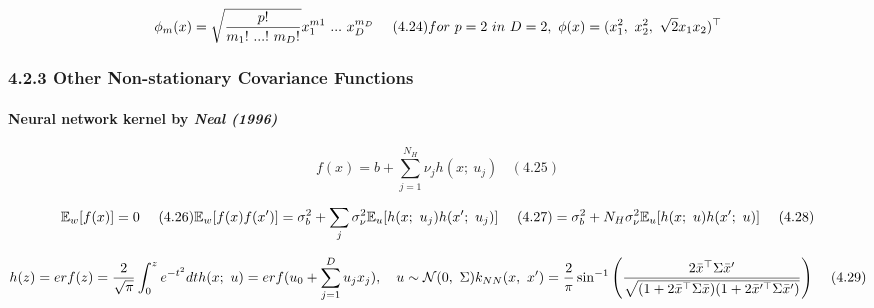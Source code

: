 \documentclass[
]{article}
\begin{document}
\[
\phi_m(x) = \sqrt {\frac {p!} {m_1!\ ... !\ m_D!}} x_1^{m1}\ ...\ x_D^{m_D}
\ \ \ \ (4.24)\\
for\ p = 2\ in\ D = 2,\ \phi(x) = (x^2_1,\ x^2_2,\ \sqrt 2x_1x_2)^{\top}
\]

\hypertarget{other-non-stationary-covariance-functions}{%
\subsubsection{4.2.3 Other Non-stationary Covariance
Functions}\label{other-non-stationary-covariance-functions}}

\hypertarget{neural-network-kernel-by-neal-1996}{%
\paragraph{\texorpdfstring{Neural network kernel by \emph{Neal
(1996)}}{Neural network kernel by Neal (1996)}}\label{neural-network-kernel-by-neal-1996}}

\[
f(x) = b + \sum^{N_H}_{j=1}
\nu_j h(x;\ u_j)
\ \ \ \ (4.25)
\]

\[
\mathbb E_w[f(x)] = 0 \ \ \ \ (4.26)\\
\mathbb E_w[f(x)f(x')] = \sigma_b^2 + 
\sum_j \sigma^2_\nu \mathbb E_u[h(x;\ u_j)h(x';\ u_j)] 
\ \ \ \ (4.27)\\
= \sigma_b^2 + N_H \sigma_\nu^2 \mathbb E_u[h(x;\ u)h(x';\ u)] \ \ \ \ (4.28)
\]

\[
h(z) = erf(z) = \frac 2 {\sqrt \pi} \int_0^z e^{-t^2} dt\\
h(x;\ u) = erf(u_0 + \sum^D_{j=1} u_jx_j) ,\ \ \
u \sim \mathcal N(0,\ \Sigma)\\
k_{NN}(x,\ x') = \frac 2 \pi \sin^{-1} 
\Bigg(\frac {2 \bar x^{\top}\Sigma \bar x'} 
{\sqrt{(1 + 2\bar x^{\top}\Sigma \bar x)  (1 + 2\bar x'^{\top}\Sigma \bar x')}}\Bigg)
\ \ \ \ (4.29)
\]
\end{document}
